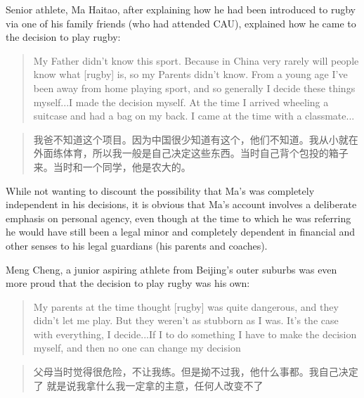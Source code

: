 \begin{CJK}{UTF8}{gbsn}
Senior athlete, Ma Haitao, after explaining how he had been introduced to rugby via one of his family friends (who had attended CAU), explained how he came to the decision to play rugby:
     \begin{quote}
       My Father didn't know this sport.  Because in China very rarely will people know what [rugby] is, so my Parents didn't know. From a young age I've been away from home playing sport, and so generally I decide these things myself...I made the decision myself.  At the time I arrived wheeling a suitcase and had a bag on my back.  I came at the time with a classmate...
     \end{quote}
     \begin{quote}
       我爸不知道这个项目。因为中国很少知道有这个，他们不知道。我从小就在外面练体育，所以我一般是自己决定这些东西。当时自己背个包投的箱子来。当时和一个同学，他是农大的。
     \end{quote}

  While not wanting to discount the possibility that Ma's was completely independent in his decisions, it is obvious that Ma's account involves a deliberate emphasis on personal agency, even though at the time to which he was referring he would have still been a legal minor and completely dependent in financial and other senses to his legal guardians (his parents and coaches).

  Meng Cheng, a junior aspiring athlete from Beijing's outer suburbs was even more proud that the decision to play rugby was his own:
       \begin{quote}
         My parents at the time thought [rugby] was quite dangerous, and they didn't let me play.  But they weren't as stubborn as I was.  It's the case with everything, I decide...If I to do something I have to make the decision myself, and then no one can change my decision\textellipsis
       \end{quote}
       \begin{quote}
         父母当时觉得很危险，不让我练。但是拗不过我，他什么事都。我自己决定了\textellipsis
         就是说我拿什么我一定拿的主意，任何人改变不了\textellipsis
       \end{quote}


\end{CJK}
